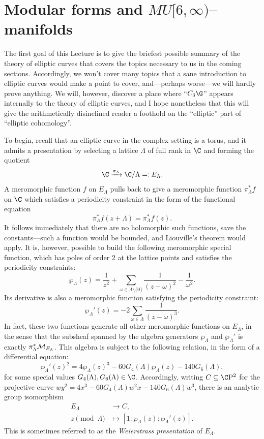 









\section{Modular forms and \texorpdfstring{\(MU[6, \infty)\)}{MU[6, oo)}--manifolds}\label{SectionEllipticCurvesAndThetaFunctions}

The first goal of this Lecture is to give the briefest possible summary of the theory of elliptic curves that covers the topics necessary to us in the coming sections.
Accordingly, we won't cover many topics that a sane introduction to elliptic curves would make a point to cover, and---perhaps worse---we will hardly prove anything.
We will, however, discover a place where ``\(C_3 \G\)'' appears internally to the theory of elliptic curves, and I hope nonetheless that this will give the arithmetically disinclined reader a foothold on the ``elliptic'' part of ``elliptic cohomology''.

To begin, recall that an elliptic curve in the complex setting is a torus, and it admits a presentation by selecting a lattice \(\Lambda\) of full rank in \(\C\) and forming the quotient \[\C \xrightarrow{\pi_\Lambda} \C / \Lambda =: E_\Lambda.\]
A meromorphic function \(f\) on \(E_\Lambda\) pulls back to give a meromorphic function \(\pi_\Lambda^* f\) on \(\C\) which satisfies a periodicity constraint in the form of the functional equation \[\pi_\Lambda^* f(z + \Lambda) = \pi_\Lambda^* f(z).\]
It follows immediately that there are no holomorphic such functions, save the constants---such a function would be bounded, and Liouville's theorem would apply.
It is, however, possible to build the following meromorphic special function, which has poles of order \(2\) at the lattice points and satisfies the periodicity constraints: \[\wp_\Lambda(z) = \frac{1}{z^2} + \sum_{\omega \in \Lambda \setminus \{0\}} \frac{1}{(z - \omega)^2} - \frac{1}{\omega^2}.\]
Its derivative is also a meromorphic function satisfying the periodicity constraint: \[\wp_\Lambda'(z) = -2 \sum_{\omega \in \Lambda} \frac{1}{(z - \omega)^3}.\]
In fact, these two functions generate all other meromorphic functions on \(E_\Lambda\), in the sense that the subsheaf spanned by the algebra generators \(\wp_\Lambda\) and \(\wp_\Lambda'\) is exactly \(\pi_\Lambda^* \mathcal{M}_{E_\Lambda}\).
This algebra is subject to the following relation, in the form of a differential equation: \[\wp_\Lambda'(z)^2 = 4 \wp_\Lambda(z)^3 - 60G_4(\Lambda) \wp_\Lambda(z) - 140G_6(\Lambda),\] for some special values \(G_4(\Lambda), G_6(\Lambda) \in \C\).
Accordingly, writing \(C \subseteq \CP^2\) for the projective curve \(wy^2 = 4x^3 - 60 G_4(\Lambda) w^2 x - 140 G_6(\Lambda) w^3\), there is an analytic group isomorphism
\begin{align*}
E_\Lambda & \to C, \\
z \pmod \Lambda & \mapsto [1: \wp_\Lambda(z): \wp_\Lambda'(z)].
\end{align*}
This is sometimes referred to as the \textit{Weierstrass presentation} of \(E_\Lambda\).

